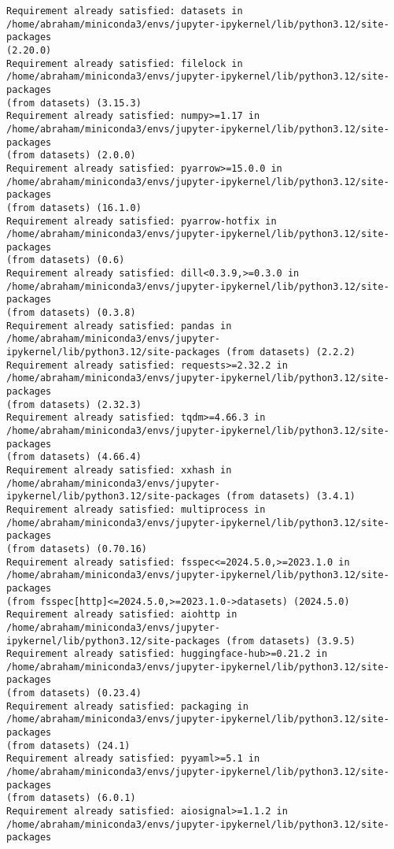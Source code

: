 \documentclass[11pt]{article}
\begin{document}
    \begin{Verbatim}[commandchars=\\\{\}]
Requirement already satisfied: datasets in
/home/abraham/miniconda3/envs/jupyter-ipykernel/lib/python3.12/site-packages
(2.20.0)
Requirement already satisfied: filelock in
/home/abraham/miniconda3/envs/jupyter-ipykernel/lib/python3.12/site-packages
(from datasets) (3.15.3)
Requirement already satisfied: numpy>=1.17 in
/home/abraham/miniconda3/envs/jupyter-ipykernel/lib/python3.12/site-packages
(from datasets) (2.0.0)
Requirement already satisfied: pyarrow>=15.0.0 in
/home/abraham/miniconda3/envs/jupyter-ipykernel/lib/python3.12/site-packages
(from datasets) (16.1.0)
Requirement already satisfied: pyarrow-hotfix in
/home/abraham/miniconda3/envs/jupyter-ipykernel/lib/python3.12/site-packages
(from datasets) (0.6)
Requirement already satisfied: dill<0.3.9,>=0.3.0 in
/home/abraham/miniconda3/envs/jupyter-ipykernel/lib/python3.12/site-packages
(from datasets) (0.3.8)
Requirement already satisfied: pandas in /home/abraham/miniconda3/envs/jupyter-
ipykernel/lib/python3.12/site-packages (from datasets) (2.2.2)
Requirement already satisfied: requests>=2.32.2 in
/home/abraham/miniconda3/envs/jupyter-ipykernel/lib/python3.12/site-packages
(from datasets) (2.32.3)
Requirement already satisfied: tqdm>=4.66.3 in
/home/abraham/miniconda3/envs/jupyter-ipykernel/lib/python3.12/site-packages
(from datasets) (4.66.4)
Requirement already satisfied: xxhash in /home/abraham/miniconda3/envs/jupyter-
ipykernel/lib/python3.12/site-packages (from datasets) (3.4.1)
Requirement already satisfied: multiprocess in
/home/abraham/miniconda3/envs/jupyter-ipykernel/lib/python3.12/site-packages
(from datasets) (0.70.16)
Requirement already satisfied: fsspec<=2024.5.0,>=2023.1.0 in
/home/abraham/miniconda3/envs/jupyter-ipykernel/lib/python3.12/site-packages
(from fsspec[http]<=2024.5.0,>=2023.1.0->datasets) (2024.5.0)
Requirement already satisfied: aiohttp in /home/abraham/miniconda3/envs/jupyter-
ipykernel/lib/python3.12/site-packages (from datasets) (3.9.5)
Requirement already satisfied: huggingface-hub>=0.21.2 in
/home/abraham/miniconda3/envs/jupyter-ipykernel/lib/python3.12/site-packages
(from datasets) (0.23.4)
Requirement already satisfied: packaging in
/home/abraham/miniconda3/envs/jupyter-ipykernel/lib/python3.12/site-packages
(from datasets) (24.1)
Requirement already satisfied: pyyaml>=5.1 in
/home/abraham/miniconda3/envs/jupyter-ipykernel/lib/python3.12/site-packages
(from datasets) (6.0.1)
Requirement already satisfied: aiosignal>=1.1.2 in
/home/abraham/miniconda3/envs/jupyter-ipykernel/lib/python3.12/site-packages

\end{Verbatim}
\end{document}
